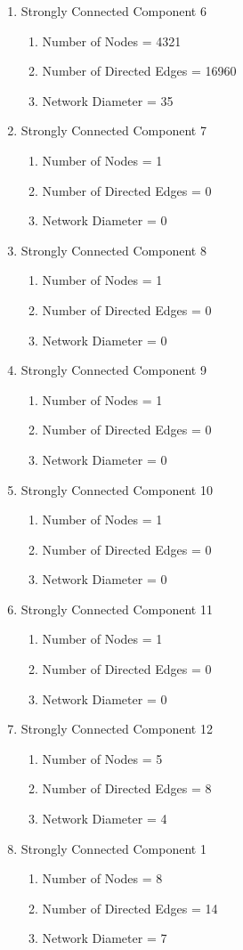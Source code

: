 \documentclass[conference]{IEEEtran}
\begin{document}
\begin{enumerate}
\begin{enumerate}
\end{enumerate}
\item Strongly Connected Component 6
\begin{enumerate}
\item Number of Nodes = 4321
\item Number of Directed Edges = 16960
\item Network Diameter = 35
\end{enumerate}
\item Strongly Connected Component 7
\begin{enumerate}
\item Number of Nodes = 1
\item Number of Directed Edges = 0
\item Network Diameter = 0
\end{enumerate}
\item Strongly Connected Component 8
\begin{enumerate}
\item Number of Nodes = 1
\item Number of Directed Edges = 0
\item Network Diameter = 0
\end{enumerate}
\item Strongly Connected Component 9
\begin{enumerate}
\item Number of Nodes = 1
\item Number of Directed Edges = 0
\item Network Diameter = 0
\end{enumerate}
\item Strongly Connected Component 10
\begin{enumerate}
\item Number of Nodes = 1
\item Number of Directed Edges = 0
\item Network Diameter = 0
\end{enumerate}
\item Strongly Connected Component 11
\begin{enumerate}
\item Number of Nodes = 1
\item Number of Directed Edges = 0
\item Network Diameter = 0
\end{enumerate}
\item Strongly Connected Component 12
\begin{enumerate}
\item Number of Nodes = 5
\item Number of Directed Edges = 8
\item Network Diameter = 4
\end{enumerate}
\item Strongly Connected Component 1
\begin{enumerate}
\item Number of Nodes = 8
\item Number of Directed Edges = 14
\item Network Diameter = 7
\end{enumerate}
\end{enumerate}
\end{document}
